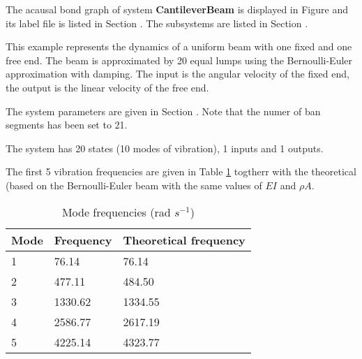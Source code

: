 

The acausal bond graph of system \textbf{CantileverBeam} is displayed in
Figure  and its label file is listed in
Section .  The subsystems are listed in Section
.
   
This example represents the dynamics of a uniform beam with one fixed
and one free end.  The beam is approximated by 20 equal lumps using
the Bernoulli-Euler approximation with damping. 
The input is the angular velocity of the fixed end, the output is the
linear velocity of the free end.

The system parameters are given in Section
. Note that the numer of ban
segments has been set to 21. 

 The system has 20 states (10
modes of vibration), 1 inputs and 1 outputs.

The first 5 vibration frequencies are given in Table \ref{tab:freq}
togtherr with the theoretical (based on the Bernoulli-Euler beam with
the same values of $EI$ and $\rho A$. 
\begin{table}[htbp]
  \begin{center}
    \begin{tabular}{||l|l|l||}
      \hline
      \hline
      Mode & Frequency & Theoretical frequency\\
      \hline
      1 &  76.14 &  76.14\\
      2 & 477.11 & 484.50\\
      3 &1330.62 &1334.55\\
      4 &2586.77 &2617.19\\
      5 &4225.14 &4323.77\\
       \hline
      \hline
    \end{tabular}
    \caption{Mode frequencies (rad $s^{-1}$)}
    \label{tab:freq}
  \end{center}
\end{table}





